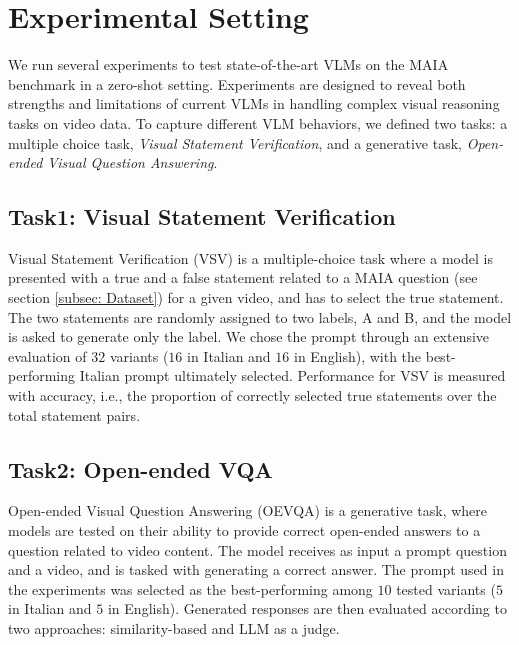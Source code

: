 \section{Experimental Setting}
\label{sec:exp_sett}

 We run several experiments to test state-of-the-art VLMs on the MAIA benchmark in a zero-shot setting. Experiments are designed to reveal both strengths and limitations of current VLMs in handling complex visual reasoning  tasks on video data. To capture different VLM behaviors, we defined two tasks: a multiple choice task, \textit{Visual Statement Verification}, and a generative task, \textit{Open-ended Visual Question Answering}.
 
 
 

\subsection{Task1: Visual Statement Verification}
\label{task1}
Visual Statement Verification (VSV) is a multiple-choice task where a model is presented with a true and a false statement related to a MAIA question (see section \ref{subsec: Dataset}) for a given video, and has to select the true statement. The two statements are randomly assigned to two labels, A and B, and the model is asked to generate only the label. We chose the prompt through an extensive evaluation of $32$ variants ($16$ in Italian and $16$ in English), with the best-performing Italian prompt ultimately selected. 
Performance for VSV is measured with accuracy, i.e.,  the proportion of correctly selected true statements over the total statement pairs. 


\subsection{Task2: Open-ended VQA}
\label{task1}
Open-ended Visual Question Answering (OEVQA) is a generative task, where models are tested on their ability to provide correct open-ended answers to a question related to video content. The model receives as input  a prompt question and a video, and is tasked with generating a correct answer. The prompt used in the experiments was selected as the best-performing among $10$ tested variants ($5$ in Italian and $5$ in English). 
Generated responses are then  evaluated according to two approaches: similarity-based  and LLM as a judge.

